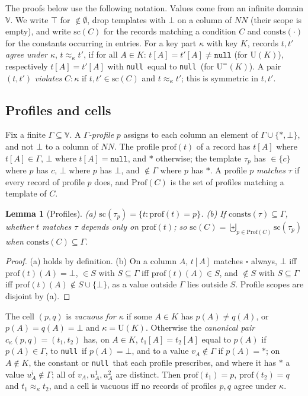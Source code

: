 \documentclass[conference]{IEEEtran}
\newtheorem{lemma}[theorem]{Lemma}
\theoremstyle{definition}
\newcommand{\nul}{\texttt{null}}
\newcommand{\NN}{\mathit{NN}}
\newcommand{\U}[1]{\mathrm{U}(#1)}
\newcommand{\Ueq}[1]{\mathrm{U}^{=}(#1)}
\newcommand{\any}{\square}
\newcommand{\scope}{\mathrm{sc}}
\newcommand{\prof}{\mathrm{prof}}
\newcommand{\Prof}{\mathrm{Prof}}
\newcommand{\consts}{\mathrm{consts}}
\newcommand{\ag}{\approx}
\begin{document}
The proofs below use the following notation. Values come from an infinite domain $\mathbb V$. We write $\top$ for ${\notin}\emptyset$, drop
templates with $\bot$ on a column of $\NN$ (their scope is empty), and write $\scope(C)$ for the
records matching a condition $C$ and $\consts(\cdot)$ for the constants occurring in entries.
For a key part $\kappa$ with key $K$, records $t,t'$ \emph{agree under $\kappa$}, $t\ag_\kappa t'$,
if for all $A\in K$: $t[A]=t'[A]\neq\nul$ (for $\U{K}$), respectively $t[A]=t'[A]$ with \nul\ equal
to \nul\ (for $\Ueq{K}$). A pair $(t,t')$ \emph{violates} $C:\kappa$ if $t,t'\in\scope(C)$ and
$t\ag_\kappa t'$; this is symmetric in $t,t'$.

\subsection{Profiles and cells}

Fix a finite $\Gamma\subseteq\mathbb V$. A \emph{$\Gamma$-profile} $p$ assigns to each column an
element of $\Gamma\cup\{*,\bot\}$, and not $\bot$ to a column of $\NN$. The profile $\prof(t)$ of a
record has $t[A]$ where $t[A]\in\Gamma$, $\bot$ where $t[A]=\nul$, and $*$ otherwise; the template
$\tau_p$ has ${\in}\{c\}$ where $p$ has $c$, $\bot$ where $p$ has $\bot$, and ${\notin}\Gamma$ where $p$
has $*$. A profile $p$ \emph{matches} $\tau$ if every record of profile $p$ does, and $\Prof(C)$ is
the set of profiles matching a template of $C$.

\begin{lemma}[Profiles]\label{lem:profiles}
(a) $\scope(\tau_p)=\{t:\prof(t)=p\}$. (b) If $\consts(\tau)\subseteq\Gamma$, whether $t$ matches
$\tau$ depends only on $\prof(t)$; so $\scope(C)=\biguplus_{p\in\Prof(C)}\scope(\tau_p)$ when
$\consts(C)\subseteq\Gamma$.
\end{lemma}

\begin{proof}
(a) holds by definition. (b) On a column $A$, $t[A]$ matches $\any$ always, $\bot$ iff
$\prof(t)(A)=\bot$, ${\in}S$ with $S\subseteq\Gamma$ iff $\prof(t)(A)\in S$, and ${\notin}S$ with
$S\subseteq\Gamma$ iff $\prof(t)(A)\notin S\cup\{\bot\}$, as a value outside $\Gamma$ lies outside
$S$. Profile scopes are disjoint by (a).
\end{proof}

The cell $(p,q)$ is \emph{vacuous for $\kappa$} if some $A\in K$ has $p(A)\neq q(A)$, or
$p(A)=q(A)=\bot$ and $\kappa=\U{K}$. Otherwise the \emph{canonical pair} $c_\kappa(p,q)=(t_1,t_2)$
has, on $A\in K$, $t_1[A]=t_2[A]$ equal to $p(A)$ if $p(A)\in\Gamma$, to \nul\ if $p(A)=\bot$, and to a
value $v_A\notin\Gamma$ if $p(A)=*$; on $A\notin K$, the constant or \nul\ that each profile
prescribes, and where it has $*$ a value $u^i_A\notin\Gamma$; all of $v_A,u^1_A,u^2_A$ are distinct.
Then $\prof(t_1)=p$, $\prof(t_2)=q$ and $t_1\ag_\kappa t_2$, and a cell is vacuous iff no records of
profiles $p,q$ agree under $\kappa$.
\end{document}
